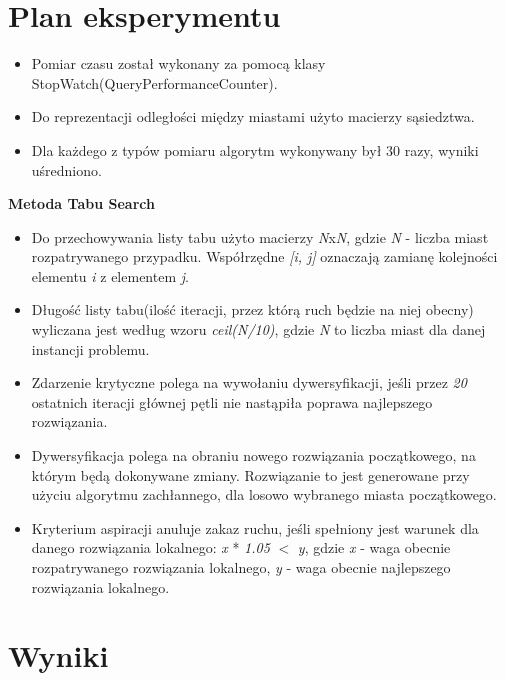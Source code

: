 \documentclass{article}
\begin{document}
\section{Plan eksperymentu}
\par
\begin{itemize}
\item Pomiar czasu został wykonany za pomocą klasy StopWatch(QueryPerformanceCounter).
\item Do reprezentacji odległości między miastami użyto macierzy sąsiedztwa.
\item Dla każdego z typów pomiaru algorytm wykonywany był 30 razy, wyniki uśredniono.
\end{itemize}

\textbf{Metoda Tabu Search}
\renewcommand\labelitemii{$\circ$}
\begin{itemize}
	\item Do przechowywania listy tabu użyto macierzy \textit{N}x\textit{N}, gdzie \textit{N} - liczba miast rozpatrywanego przypadku. Współrzędne \textit{[i, j]} oznaczają zamianę  kolejności elementu \textit{i} z elementem \textit{j}.
	\item Długość listy tabu(ilość iteracji, przez którą ruch będzie na niej obecny) wyliczana jest według wzoru \textit{ceil(N/10)}, gdzie \textit{N} to liczba miast dla danej instancji problemu.
	\item Zdarzenie krytyczne polega na wywołaniu dywersyfikacji, jeśli przez \textit{20} ostatnich iteracji głównej pętli nie nastąpiła poprawa najlepszego rozwiązania.
	\item Dywersyfikacja polega na obraniu nowego rozwiązania początkowego, na którym będą dokonywane zmiany. Rozwiązanie to jest generowane przy użyciu algorytmu zachłannego, dla losowo wybranego miasta początkowego.
	\item Kryterium aspiracji anuluje zakaz ruchu, jeśli spełniony jest warunek dla danego rozwiązania lokalnego: \textit{x} * \textit{1.05} $<$  \textit{y}, gdzie \textit{x} - waga obecnie rozpatrywanego rozwiązania lokalnego, \newline \textit{y} - waga obecnie najlepszego rozwiązania lokalnego.
\end{itemize}
\newpage

\section{Wyniki}
\end{document}
